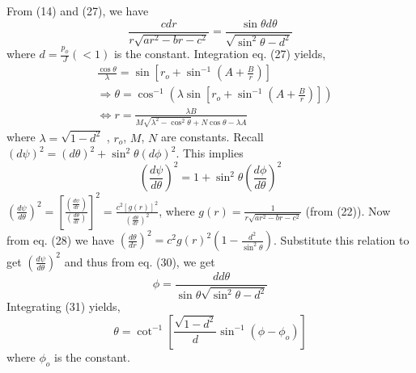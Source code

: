\documentclass[conference]{IEEEtran}
\begin{document}
From (14) and (27), we have \begin{dmath} \frac{c dr}{r\sqrt{ar^{2} - br - c^{2}}} = \frac{\sin{\theta} d\theta}{\sqrt{\sin^{2}{\theta} - d^{2}}}\end{dmath} where $d = \frac{p_{\phi}}{J} \left( < 1\right)$ is the constant. 
Integration eq. (27) yields, 
\begin{equation}
    \begin{split}
 &\frac{\cos{\theta}}{\lambda} = \sin{\left[r_{o} + \sin^{-1}{\left(A + \frac{B}{r}\right)}\right]} \\
 &\Rightarrow \theta = \cos^{-1}\left({\lambda\sin{\left[r_{o} + \sin^{-1}{\left(A + \frac{B}{r}\right)}\right]}}\right) \\
 &\Longleftrightarrow r = \frac{\lambda B}{M\sqrt{\lambda^{2} - \cos^{2}{\theta}} + N\cos{\theta} - \lambda A}
 \end{split}
 \end{equation} where $\lambda = \sqrt{1 - d^{2}}$ , $r_{o}$, $M$, $N$ are constants. 
Recall $\left(d\psi\right)^{2} = \left(d\theta\right)^{2} + \sin^{2}{\theta}\left(d\phi\right)^{2}$. This implies \begin{dmath}\left(\frac{d\psi}{d \theta}\right)^{2} = 1 + \sin^{2}{\theta}\left(\frac{d\phi}{d \theta}\right)^{2}\end{dmath} 
$\left(\frac{d\psi}{d \theta}\right)^{2} = \left[\frac{\left(\frac{d\psi}{d r}\right)}{\left(\frac{d\theta}{d r}\right)}\right]^{2} = \frac{c^{2}\left[g(r)\right]^{2}}{\left(\frac{d\theta}{d r}\right)^{2}}$, where $g(r) = \frac{1}{r\sqrt{ar^{2} - br - c^{2}}}$ (from (22)). Now from eq. (28) we have $\left(\frac{d\theta}{d r}\right)^{2} = c^{2}g(r)^{2}\left(1 - \frac{d^{2}}{\sin^{2}{\theta}}\right)$. Substitute this relation to get $\left(\frac{d\psi}{d \theta}\right)^{2}$ and thus from eq. (30), we get \begin{dmath} \phi =  \frac{d  d\theta}{\sin{\theta}{\sqrt{\sin^{2}{\theta} - d^{2}}}}\end{dmath} Integrating (31) yields, \begin{equation}\theta = \cot^{-1}{\left[\frac{\sqrt{1 - d^{2}}}{d}\sin^{-1}{\left(\phi - \phi_{o} \right)}\right]}\end{equation} where $\phi_{o}$ is the constant.
\vspace{1em}
\end{document}
